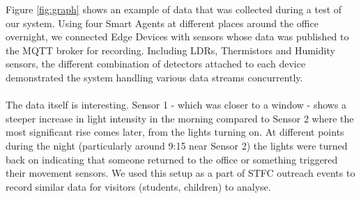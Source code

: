 Figure \ref{fig:graph} shows an example of data that was collected during a test of our system. Using four Smart Agents at different places around the office overnight, we connected Edge Devices with sensors whose data was published to the MQTT broker for recording. Including LDRs, Thermistors and Humidity sensors, the different combination of detectors attached to each device demonstrated the system handling various data streams concurrently.

\paragraph{}
The data itself is interesting. Sensor 1 - which was closer to a window - shows a steeper increase in light intensity in the morning compared to Sensor 2 where the most significant rise comes later, from the lights turning on. At different points during the night (particularly around 9:15 near Sensor 2) the lights were turned back on indicating that someone returned to the office or something triggered their movement sensors. We used this setup as a part of STFC outreach events to record similar data for visitors (students, children) to analyse.
